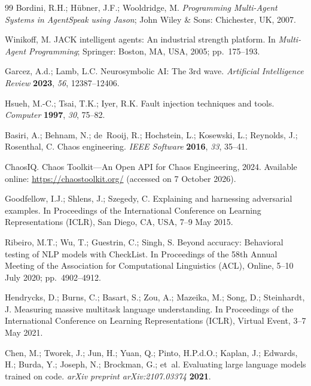 \documentclass[make,article,submit,moreauthors,pdftex]{mdpi}
\begin{document}
\begin{thebibliography}{99}
Bordini, R.H.; H{\"u}bner, J.F.; Wooldridge, M.
\newblock \textit{Programming Multi-Agent Systems in AgentSpeak using Jason};
\newblock John Wiley \& Sons: Chichester, UK, 2007.

Winikoff, M.
\newblock JACK intelligent agents: An industrial strength platform.
\newblock In \textit{Multi-Agent Programming}; Springer: Boston, MA, USA, 2005; pp.~175--193.

Garcez, A.d.; Lamb, L.C.
\newblock Neurosymbolic AI: The 3rd wave.
\newblock \textit{Artificial Intelligence Review} \textbf{2023}, \textit{56}, 12387--12406.

Hsueh, M.-C.; Tsai, T.K.; Iyer, R.K.
\newblock Fault injection techniques and tools.
\newblock \textit{Computer} \textbf{1997}, \textit{30}, 75--82.

Basiri, A.; Behnam, N.; de~Rooij, R.; Hochstein, L.; Kosewski, L.; Reynolds, J.; Rosenthal, C.
\newblock Chaos engineering.
\newblock \textit{IEEE Software} \textbf{2016}, \textit{33}, 35--41.

ChaosIQ.
\newblock Chaos Toolkit---An Open API for Chaos Engineering, 2024.
\newblock Available online: \url{https://chaostoolkit.org/} (accessed on 7 October 2026).

Goodfellow, I.J.; Shlens, J.; Szegedy, C.
\newblock Explaining and harnessing adversarial examples.
\newblock In Proceedings of the International Conference on Learning Representations (ICLR), San Diego, CA, USA, 7--9 May 2015.

Ribeiro, M.T.; Wu, T.; Guestrin, C.; Singh, S.
\newblock Beyond accuracy: Behavioral testing of NLP models with CheckList.
\newblock In Proceedings of the 58th Annual Meeting of the Association for Computational Linguistics (ACL), Online, 5--10 July 2020; pp.~4902--4912.

Hendrycks, D.; Burns, C.; Basart, S.; Zou, A.; Mazeika, M.; Song, D.; Steinhardt, J.
\newblock Measuring massive multitask language understanding.
\newblock In Proceedings of the International Conference on Learning Representations (ICLR), Virtual Event, 3--7 May 2021.

Chen, M.; Tworek, J.; Jun, H.; Yuan, Q.; Pinto, H.P.d.O.; Kaplan, J.; Edwards, H.; Burda, Y.; Joseph, N.; Brockman, G.; et~al.
\newblock Evaluating large language models trained on code.
\newblock \textit{arXiv preprint arXiv:2107.03374} \textbf{2021}.


\end{thebibliography}
\end{document}
